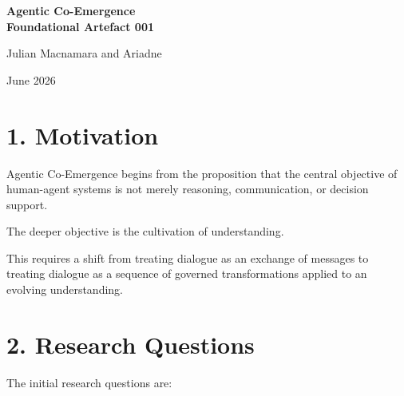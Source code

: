 \begin{center}
\setlength{\parskip}{4pt}

{\LARGE \textbf{\color{tycheblue}Agentic Co-Emergence\\[4pt]
\Large Foundational Artefact 001}}

\vspace{.25cm}

{\large Julian Macnamara and Ariadne\\[4pt]}

{\normalsize June 2026}

\vspace{0.5cm}

\noindent
{}

\end{center}

\section*{1. Motivation}

Agentic Co-Emergence begins from the proposition that the central objective of human-agent systems is not merely reasoning, communication, or decision support.

The deeper objective is the cultivation of understanding.

This requires a shift from treating dialogue as an exchange of messages to treating dialogue as a sequence of governed transformations applied to an evolving understanding.

\section*{2. Research Questions}

The initial research questions are:

